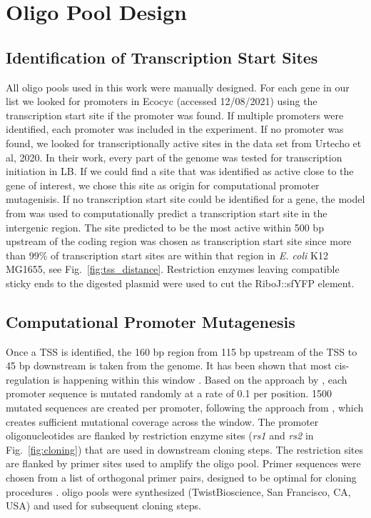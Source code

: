\section{Oligo Pool Design} \label{sec:oligo_pool}
\subsection{Identification of Transcription Start Sites}
\label{sec:ident_tss}
All oligo pools used in this work were manually designed. For each gene in our list we looked for promoters in Ecocyc \cite{keseler2010ecocyc} (accessed 12/08/2021) using the transcription start site if the promoter was found. If multiple promoters were identified, each promoter was included in the experiment. If no promoter was found, we looked for transcriptionally active sites in the data set from Urtecho et al, 2020\cite{urtecho2020genome}. In their work, every part of the genome was tested for transcription initiation in LB. If we could find a site that was identified as active close to the gene of interest, we chose this site as origin for computational promoter mutagenisis. If no transcription start site could be identified for a gene, the model from \cite{lafleur2022automated} was used to computationally predict a transcription start site in the intergenic region. The site predicted to be the most active within 500 bp upstream of the coding region was chosen as transcription start site since more than 99\% of transcription start sites are within that region in \textit{E. coli} K12 MG1655, see Fig.~\ref{fig:tss_distance}. Restriction enzymes leaving compatible sticky ends to the digested plasmid were used to cut the RiboJ::sfYFP element.  


\subsection{Computational Promoter Mutagenesis}
\label{sec:comp_prom_muta}
Once a TSS is identified, the 160 bp region from 115 bp upstream of the TSS to 45 bp downstream is taken from the genome. It has been shown that most cis-regulation is happening within this window \cite{rydenfelt2014statistical}. Based on the approach by \cite{kinney2010using}, each promoter sequence is mutated randomly at a rate of 0.1 per position. 1500 mutated sequences are created per promoter, following the approach from \cite{ireland2020deciphering}, which creates sufficient mutational coverage across the window. The promoter oligonucleotides are flanked by restriction enzyme sites (\textit{rs1} and \textit{rs2} in Fig.~\ref{fig:cloning}) that are used in downstream cloning steps. The restriction sites are flanked by primer sites used to amplify the oligo pool. Primer sequences were chosen from a list of orthogonal primer pairs, designed to be optimal for cloning procedures \cite{subramanian2018set}. oligo pools were synthesized (TwistBioscience, San Francisco, CA, USA) and used for subsequent cloning steps.


